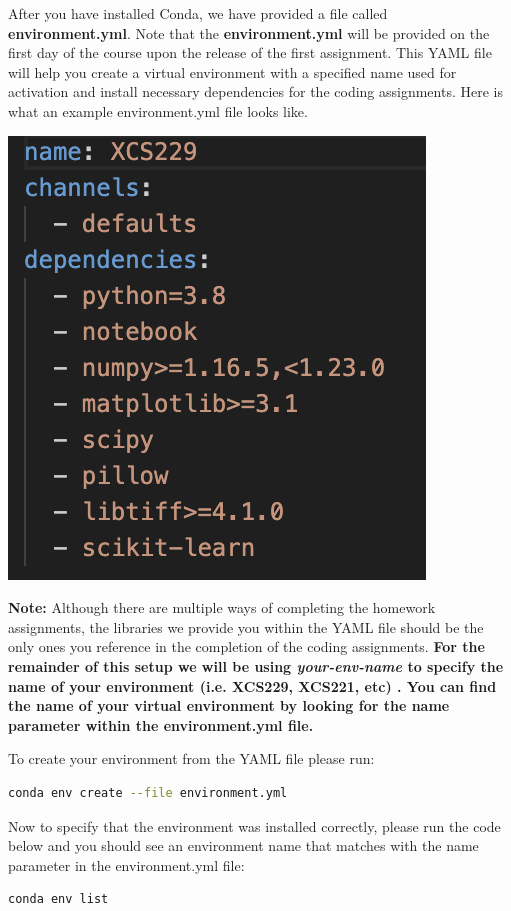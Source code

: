 \documentclass{article}
\begin{document}
After you have installed Conda, we have provided a file called \textbf{environment.yml}. Note that the \textbf{environment.yml} will be provided on the first day of the course upon the release of the first assignment. This YAML file will help you create a virtual environment with a specified name used for activation and install necessary dependencies for the coding assignments. Here is what an example environment.yml file looks like.
\begin{center}
\includegraphics[scale=0.75]{conda-update.png}
\end{center}
\textbf{Note: }Although there are multiple ways of completing the homework assignments, the libraries we provide you within the YAML file should be the only ones you reference in the completion of the coding assignments. 
\textbf{For the remainder of this setup we will be using \textit{your-env-name} to specify the name of your environment (i.e. XCS229, XCS221, etc) . You can find the name of your virtual environment by looking for the name parameter within the environment.yml file.} 

To create your environment from the YAML file please run: 
\begin{lstlisting}[language=bash]
conda env create --file environment.yml
\end{lstlisting}
Now to specify that the environment was installed correctly, please run the code below and you should see an environment name that matches with the name parameter in the environment.yml file:
\begin{lstlisting}[language=bash]
conda env list
\end{lstlisting}
\end{document}
